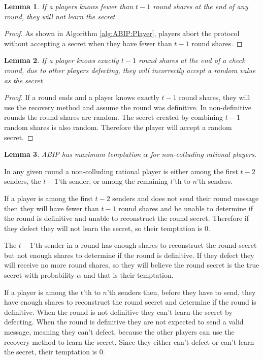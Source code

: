 \documentclass{dalcsthesis}
\newtheorem{lemma}{Lemma}
\begin{document}
\begin{lemma} If a players knows fewer than $t-1$ round shares at the end of any round, they will not learn the secret \label{Lem:ABIP:FewSharesNolearn} \end{lemma}
\begin{proof}
As shown in Algorithm \ref{alg:ABIP:Player}, players abort the protocol without accepting a secret when they have fewer than $t-1$ round shares. 
\end{proof}

\begin{lemma} If a player knows exactly $t-1$ round shares at the end of a check round, due to other players defecting, they will incorrectly accept a random value as the secret \label{Lem:ABIP:MissDefSharesLearnWrong} \end{lemma}
\begin{proof}
If a round ends and a player knows exactly $t-1$ round shares, they will use the recovery method and assume the round was definitive. In non-definitive rounds the round shares are random. The secret created by combining $t-1$ random shares is also random. Therefore the player will accept a random secret.
\end{proof}

\begin{lemma} ABIP has maximum temptation $\alpha$ for non-colluding rational players. \label{Lem:ABIP:SoloTemptation} \end{lemma}

In any given round a non-colluding rational player is either among the first $t-2$ senders, the $t-1$'th sender, or among the remaining $t$'th to $n$'th senders.

If a player is among the first $t-2$ senders and does not send their round message then they will have fewer than $t-1$ round shares and be unable to determine if the round is definitive and unable to reconstruct the round secret. Therefore if they defect they will not learn the secret, so their temptation is $0$.

The $t-1$'th sender in a round has enough shares to reconstruct the round secret but not enough shares to determine if the round is definitive. If they defect they will receive no more round shares, so they will believe the round secret is the true secret with probability $\alpha$ and that is their temptation.

If a player is among the $t$'th to $n$'th senders then, before they have to send, they have enough shares to reconstruct the round secret and determine if the round is definitive. When the round is not definitive they can't learn the secret by defecting. When the round is definitive they are not expected to send a valid message, meaning they can't defect, because the other players can use the recovery method to learn the secret. Since they either can't defect or can't learn the secret, their temptation is $0$.
\end{document}
